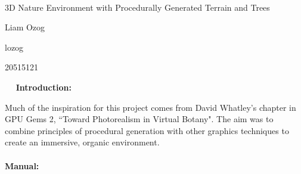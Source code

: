 \documentclass{article}
\newcommand\projecttitle{3D Nature Environment with Procedurally Generated Terrain and Trees}
\newcommand\myname{Liam Ozog}
\newcommand\myuserid{lozog}
\newcommand\mystudentid{20515121}
\begin{document}
~\vfill
\begin{center}
\Large

\projecttitle

\myname

\myuserid

\mystudentid

\end{center}
\vfill ~\vfill~
\newpage
\Large\noindent\textbf{Introduction:} \\
\normalsize

Much of the inspiration for this project comes from David Whatley's chapter in GPU Gems 2, ``Toward Photorealism in Virtual Botany". The aim was to combine principles of procedural generation with other graphics techniques to create an immersive, organic environment.
\\\\
\Large\textbf{Manual:}
\normalsize
\end{document}
